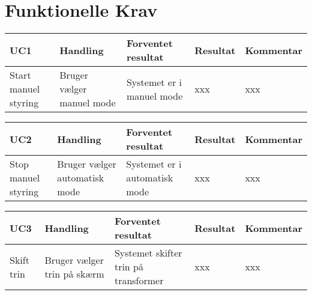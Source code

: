 
\section{Funktionelle Krav}
\begin{table}[htbp]
	\centering
	\begin{tabular}{|p{2cm}|p{3.5cm}|p{4cm}|p{2cm}|p{2.5cm}|}
		\hline
		\textbf{UC1} & \textbf{Handling} & \textbf{Forventet resultat} & \textbf{Resultat} &\textbf{Kommentar} \\\hline
		Start manuel styring & Bruger vælger manuel mode & Systemet er i manuel mode & xxx & xxx \\\hline
		
		
	\end{tabular}

	
\end{table}

\begin{table}[htbp]
	\centering
	\begin{tabular}{|p{2cm}|p{3.5cm}|p{4cm}|p{2cm}|p{2.5cm}|}
		\hline
		\textbf{UC2} & \textbf{Handling} & \textbf{Forventet resultat} & \textbf{Resultat} &\textbf{Kommentar} \\\hline
		Stop manuel styring & Bruger vælger automatisk mode & Systemet er i automatisk mode & xxx & xxx \\\hline
		
		
	\end{tabular}

	
\end{table}
\begin{table}[htbp]
	\centering
	\begin{tabular}{|p{2cm}|p{3.5cm}|p{4cm}|p{2cm}|p{2.5cm}|}
		\hline
		\textbf{UC3} & \textbf{Handling} & \textbf{Forventet resultat} & \textbf{Resultat} &\textbf{Kommentar} \\\hline
		Skift trin & Bruger vælger trin på skærm & Systemet skifter trin på transformer & xxx & xxx \\\hline
		
		
	\end{tabular}

	
\end{table}
